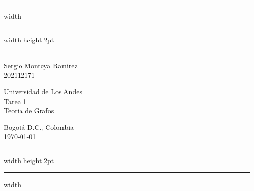 \newenvironment{notes}
  {\begin{list}
     {{\fbseries Note \arabic{counter}.}}
    {\usecounter{counter}
     \setlength{\labelsep}{1em}
     \setlength{\itemsep}{2pt}
     \setlength{\leftmargin}{2em}
     \setlength{\rightmargin}{0cm}
     \setlength{\itemindent}{1em} }}
{\end{list}}

\vspace*{-1cm}
\hrule width \hsize \kern 1mm \hrule width \hsize height 2pt
\begin{center}
   \parbox[c]{.32\textwidth}{
   \hspace{1cm}\\
   Sergio Montoya Ramirez\\
   202112171}
   \hspace*{\fill}
   \parbox[c]{.35\textwidth}{\centering
   Universidad de Los Andes\\
   Tarea 1\\
   Teoria de Grafos\\
   }
   \hspace*{\fill}
   \parbox[c]{.3\textwidth}{
   \begin{flushleft}
      Bogotá D.C., Colombia\\
      \today
   \end{flushleft}}
\end{center}
\hrule width \hsize height 2pt \kern 1mm \hrule width \hsize

\bigskip

\bigskip
